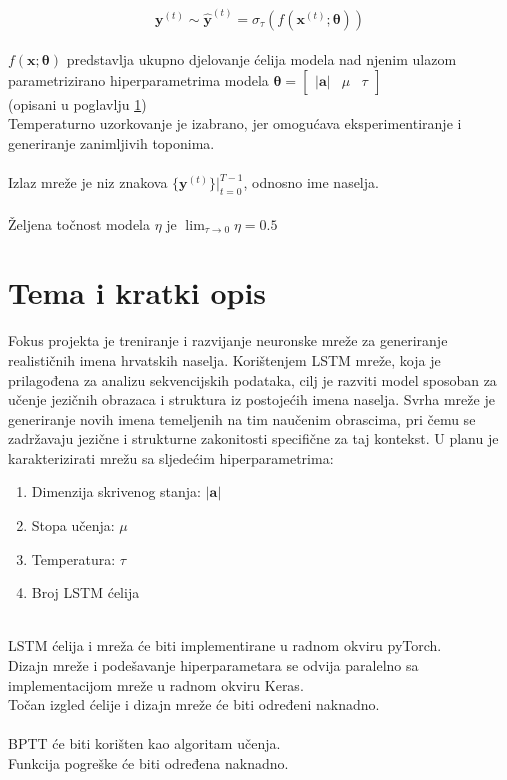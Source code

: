 \documentclass{report}
\begin{document}
\begin{equation}
 \mathbf{y}^{(t)} \sim \hat{\mathbf{y}}^{(t)} = \sigma_{\tau}(f(\mathbf{x}^{(t)} ; \boldsymbol{\theta}))
\end{equation}
\ \\
$f(\mathbf{x} ; \boldsymbol{\theta})$ predstavlja ukupno djelovanje ćelija modela nad njenim ulazom parametrizirano hiperparametrima modela $\boldsymbol{\theta} = \begin{bmatrix} \lvert \mathbf{a} \rvert & \mu & \tau \end{bmatrix}$\\ (opisani u poglavlju \ref{sec_tema})
\ \\
Temperaturno uzorkovanje je izabrano, jer omogućava eksperimentiranje i generiranje zanimljivih toponima.\\
\\
Izlaz mreže je niz znakova $\{\mathbf{y}^{(t)}\} \biggr \rvert_{t=0}^{T-1}$, odnosno ime naselja.\\
\\
Željena točnost modela $\eta$ je $\lim_{\tau \to 0} \eta = 0.5$

\section{Tema i kratki opis}
\label{sec_tema}
Fokus projekta je treniranje i razvijanje neuronske mreže za generiranje realističnih imena hrvatskih naselja. Korištenjem LSTM mreže, koja je prilagođena za analizu sekvencijskih podataka, cilj je razviti model sposoban za učenje jezičnih obrazaca i struktura iz postojećih imena naselja. Svrha mreže je generiranje novih imena temeljenih na tim naučenim obrascima, pri čemu se zadržavaju jezične i strukturne zakonitosti specifične za taj kontekst. U planu je karakterizirati mrežu sa sljedećim hiperparametrima:
\begin{enumerate}
\item Dimenzija skrivenog stanja: $\lvert \mathbf{a} \rvert$
\item Stopa učenja: $\mu$
\item Temperatura: $\tau$
\item Broj LSTM ćelija
\end{enumerate}
\ \\
LSTM ćelija i mreža će biti implementirane u radnom okviru pyTorch.\\
Dizajn mreže i podešavanje hiperparametara se odvija paralelno sa implementacijom mreže u radnom okviru Keras.\\
Točan izgled ćelije i dizajn mreže će biti određeni naknadno.\\
\\
BPTT će biti korišten kao algoritam učenja.\\
Funkcija pogreške će biti određena naknadno.\\
\end{document}
